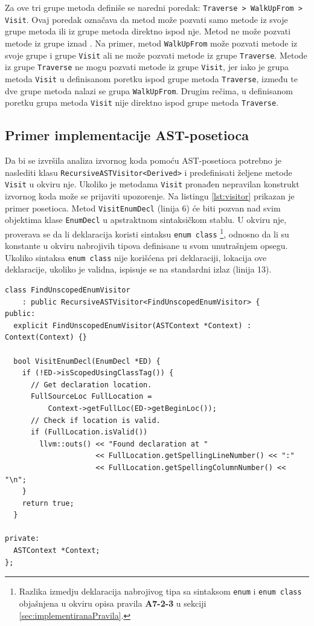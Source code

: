 \documentclass[12pt,oneside]{memoir}
\begin{document}
Za ove tri grupe metoda defini\v{s}e se naredni poredak: \texttt{Traverse > WalkUpFrom > Visit}. Ovaj poredak ozna\v{c}ava da metod mo\v{z}e pozvati samo metode iz svoje grupe metoda ili iz grupe metoda direktno ispod nje. Metod ne mo\v{z}e pozvati metode iz grupe iznad \cite{visitors}. Na primer, metod \texttt{WalkUpFrom} mo\v{z}e pozvati metode iz svoje grupe i grupe \texttt{Visit} ali 
ne mo\v{z}e pozvati metode iz grupe \texttt{Traverse}. Metode iz grupe \texttt{Traverse} ne mogu pozvati metode iz grupe \texttt{Visit}, jer iako je grupa metoda \texttt{Visit} u definisanom poretku ispod grupe metoda \texttt{Traverse}, između te dve grupe metoda nalazi se grupa \texttt{WalkUpFrom}.
Drugim re\v{c}ima, u definisanom poretku grupa metoda \texttt{Visit} nije direktno ispod grupe metoda \texttt{Traverse}.

\subsection{Primer implementacije AST-posetioca}
Da bi se izvršila analiza izvornog koda pomoću AST-posetioca potrebno je naslediti klasu 
 \texttt{RecursiveASTVisitor<Derived>} i predefinisati željene metode \texttt{Visit} u okviru nje. Ukoliko je metodama \texttt{Visit} pronađen nepravilan konstrukt izvornog koda mo\v{z}e se prijaviti upozorenje. Na listingu \ref{lst:visitor} prikazan je primer posetioca. Metod \texttt{VisitEnumDecl} (linija 6) \'c{e} biti pozvan nad svim objektima klase \texttt{EnumDecl} u apstraktnom sintaksi\v{c}kom stablu. U okviru nje, proverava se da li deklaracija koristi sintaksu \texttt{enum class} \footnote{Razlika izmedju deklaracija nabrojivog tipa sa sintaksom \texttt{enum} i  \texttt{enum class} obja\v{s}njena u okviru opisa pravila \textbf{A7-2-3} u sekciji \ref{sec:implementiranaPravila}.}, odnosno da li su konstante u okviru nabrojivih tipova definisane u svom unutra\v{s}njem opsegu. Ukoliko sintaksa \texttt{enum class} nije kori\v{s}\'{c}ena pri deklaraciji, lokacija ove deklaracije, ukoliko je validna, ispisuje se na standardni izlaz (linija 13).

\begin{lstlisting}[style=customc,  caption={Primer posetioca koji pose\'{c}uje sve deklaracije nabrojivih tipova i ispisuje lokaciju onih koji nisu deklarisani sintaksom \texttt{enum class}.},label=lst:visitor]
class FindUnscopedEnumVisitor
    : public RecursiveASTVisitor<FindUnscopedEnumVisitor> {
public:
  explicit FindUnscopedEnumVisitor(ASTContext *Context) : Context(Context) {}

  bool VisitEnumDecl(EnumDecl *ED) {
    if (!ED->isScopedUsingClassTag()) {
      // Get declaration location.
      FullSourceLoc FullLocation =
          Context->getFullLoc(ED->getBeginLoc());
      // Check if location is valid.
      if (FullLocation.isValid())
        llvm::outs() << "Found declaration at "
                     << FullLocation.getSpellingLineNumber() << ":"
                     << FullLocation.getSpellingColumnNumber() << "\n";
    }
    return true;
  }

private:
  ASTContext *Context;
};
\end{lstlisting}
\end{document}
